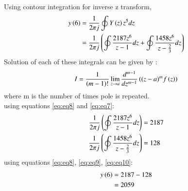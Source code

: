 \documentclass[journal,12pt,twocolumn]{IEEEtran}
\theoremstyle{remark}
\begin{document}
Using contour integration for inverse z transform,
\begin{align}
    y\left(6\right) &= \frac{1}{2\pi j}\oint Y\left(z\right) z^{5} dz\\
    &= \frac{1}{2\pi j}\left(\oint\frac{2187z^{6}}{z-1}dz + \oint\frac{1458z^{6}}{z - \frac{2}{3}} dz\right) \label{eq:eq8}
\end{align}
Solution of each of these integrals can be given by :
\begin{align}
    I =\frac{1}{\left(m-1\right)!}\lim\limits_{z\to a}\frac{d^{m-1}}{dz^{m-1}}\left({(z-a)}^{m}f\left(z\right)\right) \label{eq:eq7}
\end{align}
where m is the number of times pole is repeated.\\
using equations \eqref{eq:eq8} and \eqref{eq:eq7}:
\begin{align}
    \frac{1}{2\pi j}\left(\oint\frac{2187z^{6}}{z - 1}dz\right) &= 2187\label{eq:eq9}\\
     \frac{1}{2\pi j}\left(\oint\frac{1458z^{6}}{z - \frac{2}{3}}dz\right)  &= 128\label{eq:eq10}
     \end{align}
using equations \eqref{eq:eq8}, \eqref{eq:eq9}, \eqref{eq:eq10}:
\begin{align}
y\left(6\right) &= 2187 - 128\\
&= 2059
\end{align}
\end{document}

